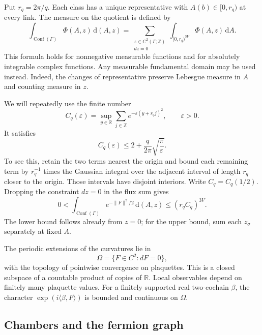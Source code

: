 \documentclass[11pt,letterpaper,reqno]{amsart}
\newcommand{\R}{\mathbb R}
\newcommand{\Z}{\mathbb Z}
\newcommand{\dd}{\mathrm d}
\begin{document}
Put $r_q=2\pi/q$. Each class has a unique representative with
$A(b)\in[0,r_q)$ at every link. The measure on the quotient is defined
by
\begin{equation}\label{eq:reg-configuration-integral}
 \int_{\operatorname{Conf}(\Gamma)}\Phi(A,z)\,\dd(A,z)
 =\sum_{\substack{z\in C^2(\Gamma;\Z)\\dz=0}}
       \int_{[0,r_q)^{3V}}\Phi(A,z)\,\dd A.
\end{equation}
This formula holds for nonnegative measurable functions and for
absolutely integrable complex functions. Any measurable fundamental
domain may be used instead. Indeed, the changes of representative
preserve Lebesgue measure in $A$ and counting measure in $z$.

We will repeatedly use the finite number
\begin{equation}\label{eq:reg-gaussian-sum}
 C_q(\varepsilon)=\sup_{y\in\R}\sum_{j\in\Z}
                  e^{-\varepsilon(y+r_qj)^2},\qquad \varepsilon>0.
\end{equation}
It satisfies
\[
 C_q(\varepsilon)\le2+\frac{q}{2\pi}\sqrt{\frac{\pi}{\varepsilon}}.
\]
To see this, retain the two terms nearest the origin and bound each
remaining term by $r_q^{-1}$ times the Gaussian integral over the
adjacent interval of length $r_q$ closer to the origin. Those intervals
have disjoint interiors. Write $C_q=C_q(1/2)$. Dropping the constraint
$dz=0$ in the flux sum gives
\begin{equation}\label{eq:reg-maxwell-integral}
 0<\int_{\operatorname{Conf}(\Gamma)}e^{-\|F\|^2/2}\,\dd(A,z)
 \le(r_qC_q)^{3V}.
\end{equation}
The lower bound follows already from $z=0$; for the upper bound, sum
each $z_\sigma$ separately at fixed $A$.

The periodic extensions of the curvatures lie in
\[
 \Omega=\{F\in C^2:dF=0\},
\]
with the topology of pointwise convergence on plaquettes. This is a
closed subspace of a countable product of copies of $\R$. Local
observables depend on finitely many plaquette values. For a finitely
supported real two-cochain $\beta$, the character
$\exp(i\langle\beta,F\rangle)$ is bounded and continuous on $\Omega$.

\subsection{Chambers and the fermion graph}\label{subsec:reg-chambers}
\end{document}
